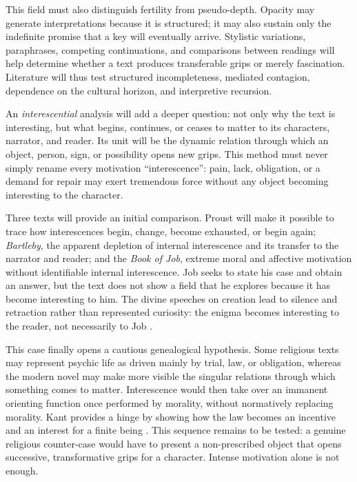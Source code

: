 \documentclass[11pt,a4paper]{article}
\begin{document}
This field must also distinguish fertility from pseudo-depth. Opacity may
generate interpretations because it is structured; it may also sustain only the
indefinite promise that a key will eventually arrive. Stylistic variations,
paraphrases, competing continuations, and comparisons between readings will
help determine whether a text produces transferable grips or merely
fascination. Literature will thus test structured incompleteness, mediated
contagion, dependence on the cultural horizon, and interpretive recursion.

An \emph{interescential} analysis will add a deeper question: not only why the
text is interesting, but what begins, continues, or ceases to matter to its
characters, narrator, and reader. Its unit will be the dynamic relation through
which an object, person, sign, or possibility opens new grips. This method must
never simply rename every motivation ``interescence'': pain, lack, obligation,
or a demand for repair may exert tremendous force without any object becoming
interesting to the character.

Three texts will provide an initial comparison. Proust will make it possible to
trace how interescences begin, change, become exhausted, or begin again;
\emph{Bartleby}, the apparent depletion of internal interescence and its
transfer to the narrator and reader; and the \emph{Book of Job}, extreme moral
and affective motivation without identifiable internal interescence. Job seeks
to state his case and obtain an answer, but the text does not show a field that
he explores because it has become interesting to him. The divine speeches on
creation lead to silence and retraction rather than represented curiosity: the
enigma becomes interesting to the reader, not necessarily to Job
\parencite{jps1985tanakh}.

This case finally opens a cautious genealogical hypothesis. Some religious
texts may represent psychic life as driven mainly by trial, law, or obligation,
whereas the modern novel may make more visible the singular relations through
which something comes to matter. Interescence would then take over an immanent
orienting function once performed by morality, without normatively replacing
morality. Kant provides a hinge by showing how the law becomes an incentive and
an interest for a finite being \parencite{kant1848moralepratique}. This sequence
remains to be tested: a genuine religious counter-case would have to present a
non-prescribed object that opens successive, transformative grips for a
character. Intense motivation alone is not enough.
\end{document}
